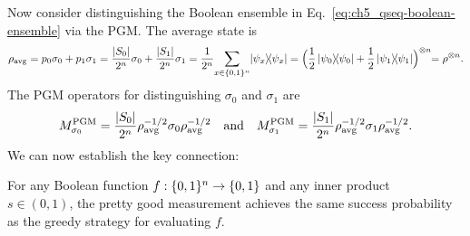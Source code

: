 Now consider distinguishing the Boolean ensemble in Eq.~\eqref{eq:ch5_qseq-boolean-ensemble} via the PGM.
The average state is
\begin{equation}
    \rho_{\text{avg}}
    = p_0 \sigma_0 + p_1 \sigma_1 = \frac{\abs{S_0}}{2^n} \sigma_0 + \frac{\abs{S_1}}{2^n} \sigma_1
    = \frac{1}{2^n} \!\sum_{x \in \{ 0, 1 \}^n}\! \ketbra{\psi_x}
    = \Bigl(\frac{1}{2}\ketbra{\psi_0} + \frac{1}{2}\ketbra{\psi_1}\Bigr)^{\otimes n}\!\!
    = \rho^{\otimes n}.
\end{equation}
The PGM operators for distinguishing $\sigma_0$ and $\sigma_1$ are
\begin{equation}
    M_{\sigma_0}^{\text{PGM}}
    = \frac{\abs{S_0}}{2^n} \rho_{\text{avg}}^{-1/2} \sigma_0 \rho_{\text{avg}}^{-1/2}
    \quad \text{and} \quad
    M_{\sigma_1}^{\text{PGM}}
    = \frac{\abs{S_1}}{2^n} \rho_{\text{avg}}^{-1/2} \sigma_1 \rho_{\text{avg}}^{-1/2}.
\end{equation}
We can now establish the key connection:

\begin{theorem}\label{thm:ch5_qseq-pgm-local}
    For any Boolean function $f:\{ 0, 1 \}^n \to \{ 0, 1 \}$ and any inner product \\ $s \in (0,1)$, the pretty good measurement achieves the same success probability as the greedy strategy for evaluating $f$.
\end{theorem}

